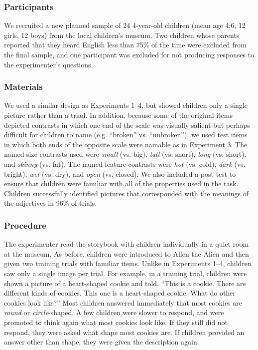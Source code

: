 \documentclass[man]{apa2}
\begin{document}
\subsubsection{Participants}

We recruited a new planned sample of 24 4-year-old children (mean age 4;6, 12 girls, 12 boys) from the local children's museum.  Two children whose parents reported that they heard English less than 75\% of the time were excluded from the final sample, and one participant was excluded for not producing responses to the experimenter's questions.

\subsubsection{Materials}

We used a similar design as Experiments 1--4, but showed children only a single picture rather than a triad.  In addition, because some of the original items depicted contrasts in which one end of the scale was visually salient but perhaps difficult for children to name (e.g. ``broken'' vs. ``unbroken''), we used test items in which both ends of the opposite scale were namable as in Experiment 3. The named size contrasts used were \emph{small} (vs. big), \emph{tall} (vs. short), \emph{long} (vs. short), and \emph{skinny} (vs. fat).  The named feature contrasts were \emph{hot} (vs. cold), \emph{dark} (vs. bright), \emph{wet} (vs. dry), and \emph{open} (vs. closed).  We also included a post-test to ensure that children were familiar with all of the properties used in the task.  Children successfully identified pictures that corresponded with the meanings of the adjectives in 96\% of trials.

\subsubsection{Procedure}

The experimenter read the storybook with children individually in a quiet room at the museum. As before, children were introduced to Allen the Alien and then given two training trials with familiar items. Unlike in  Experiments 1--4, children saw only a single image per trial. For example, in a training trial, children were shown a picture of a heart-shaped cookie and told, ``This is a cookie.  There are different kinds of cookies.  This one is a heart-shaped cookie.  What do other cookies look like?'' Most children answered immediately that most cookies are \emph{round} or \emph{circle}-shaped. A few children were slower to respond, and were promoted to think again what most cookies look like. If they still did not respond, they were asked what shape most cookies are.  If children provided an answer other than shape, they were given the description again.
\end{document}
